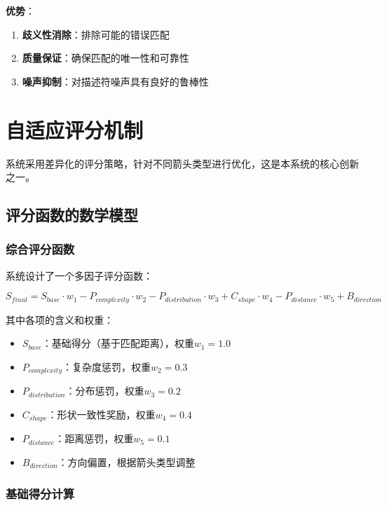 \documentclass[12pt]{article}
\begin{document}
\textbf{优势}：
\begin{enumerate}
    \item \textbf{歧义性消除}：排除可能的错误匹配
    \item \textbf{质量保证}：确保匹配的唯一性和可靠性
    \item \textbf{噪声抑制}：对描述符噪声具有良好的鲁棒性
\end{enumerate}

\section{自适应评分机制}

系统采用差异化的评分策略，针对不同箭头类型进行优化，这是本系统的核心创新之一。

\subsection{评分函数的数学模型}

\subsubsection{综合评分函数}

系统设计了一个多因子评分函数：

\begin{equation}
S_{final} = S_{base} \cdot w_1 - P_{complexity} \cdot w_2 - P_{distribution} \cdot w_3 + C_{shape} \cdot w_4 - P_{distance} \cdot w_5 + B_{direction}
\end{equation}

其中各项的含义和权重：
\begin{itemize}
    \item $S_{base}$：基础得分（基于匹配距离），权重$w_1 = 1.0$
    \item $P_{complexity}$：复杂度惩罚，权重$w_2 = 0.3$
    \item $P_{distribution}$：分布惩罚，权重$w_3 = 0.2$
    \item $C_{shape}$：形状一致性奖励，权重$w_4 = 0.4$
    \item $P_{distance}$：距离惩罚，权重$w_5 = 0.1$
    \item $B_{direction}$：方向偏置，根据箭头类型调整
\end{itemize}

\subsubsection{基础得分计算}
\end{document}
